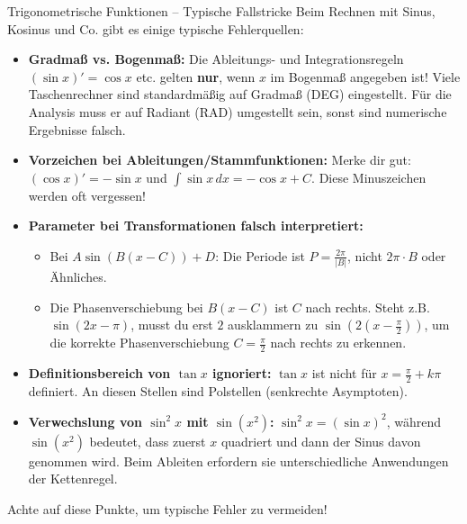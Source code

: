 \begin{fehlerboxumgebung}{Trigonometrische Funktionen – Typische Fallstricke}
Beim Rechnen mit Sinus, Kosinus und Co. gibt es einige typische Fehlerquellen:
\begin{itemize}
    \item \textbf{Gradmaß vs. Bogenmaß:} Die Ableitungs- und Integrationsregeln $(\sin x)'=\cos x$ etc. gelten \textbf{nur}, wenn $x$ im Bogenmaß angegeben ist! Viele Taschenrechner sind standardmäßig auf Gradmaß (DEG) eingestellt. Für die Analysis muss er auf Radiant (RAD) umgestellt sein, sonst sind numerische Ergebnisse falsch.
    \item \textbf{Vorzeichen bei Ableitungen/Stammfunktionen:} Merke dir gut: $(\cos x)' = \mathbf{-}\sin x$ und $\int \sin x \,dx = \mathbf{-}\cos x + C$. Diese Minuszeichen werden oft vergessen!
    \item \textbf{Parameter bei Transformationen falsch interpretiert:}
        \begin{itemize}
            \item Bei $A \sin(B(x-C))+D$: Die Periode ist $P=\frac{2\pi}{|B|}$, nicht $2\pi \cdot B$ oder Ähnliches.
            \item Die Phasenverschiebung bei $B(x-C)$ ist $C$ nach rechts. Steht z.B. $\sin(2x-\pi)$, musst du erst $2$ ausklammern zu $\sin(2(x-\frac{\pi}{2}))$, um die korrekte Phasenverschiebung $C=\frac{\pi}{2}$ nach rechts zu erkennen.
        \end{itemize}
    \item \textbf{Definitionsbereich von $\tan x$ ignoriert:} $\tan x$ ist nicht für $x = \frac{\pi}{2} + k\pi$ definiert. An diesen Stellen sind Polstellen (senkrechte Asymptoten).
    \item \textbf{Verwechslung von $\sin^2 x$ mit $\sin(x^2)$:} $\sin^2 x = (\sin x)^2$, während $\sin(x^2)$ bedeutet, dass zuerst $x$ quadriert und dann der Sinus davon genommen wird. Beim Ableiten erfordern sie unterschiedliche Anwendungen der Kettenregel.
\end{itemize}
Achte auf diese Punkte, um typische Fehler zu vermeiden!
\end{fehlerboxumgebung}

